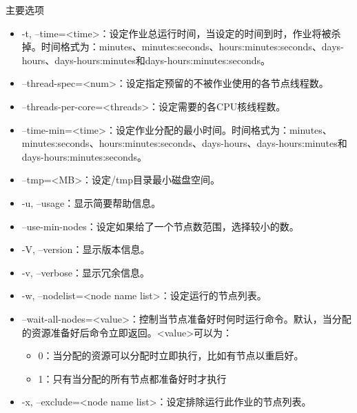 \begin{frame}{主要选项}
\begin{itemize}
%
    \item -t, --time=<time>：设定作业总运行时间，当设定的时间到时，作业将被杀掉。时间格式为：minutes、minutes:seconds、hours:minutes:seconds、days-hours、days-hours:minutes和days-hours:minutes:seconds。
	\item --thread-spec=<num>：设定指定预留的不被作业使用的各节点线程数。
	\item --threads-per-core=<threads>：设定需要的各CPU核线程数。
	\item --time-min=<time>：设定作业分配的最小时间。时间格式为：minutes、minutes:seconds、hours:minutes:seconds、days-hours、days-hours:minutes和
days-hours:minutes:seconds。
	\item --tmp=<MB>：设定/tmp目录最小磁盘空间。
	\item -u, --usage：显示简要帮助信息。
	\item --use-min-nodes：设定如果给了一个节点数范围，选择较小的数。
	\item -V, --version：显示版本信息。
	\item -v, --verbose：显示冗余信息。
	\item -w, --nodelist=<node name list>：设定运行的节点列表。
	\item --wait-all-nodes=<value>：控制当节点准备好时何时运行命令。默认，当分配的资源准备好后命令立即返回。<value>可以为：
\begin{itemize}
	\item 0：当分配的资源可以分配时立即执行，比如有节点以重启好。
    \item 1：只有当分配的所有节点都准备好时才执行
\end{itemize}


    \item -x, --exclude=<node name list>：设定排除运行此作业的节点列表。
\end{itemize}
\end{frame}

